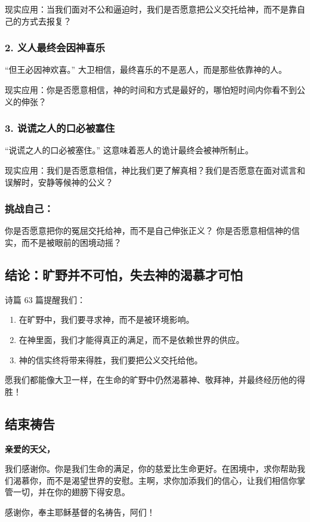 \documentclass[a4paper, 12pt]{article}
\begin{document}
现实应用：当我们面对不公和逼迫时，我们是否愿意把公义交托给神，而不是靠自己的方式去报复？
\subsubsection*{2. 义人最终会因神喜乐}
“但王必因神欢喜。” 大卫相信，最终喜乐的不是恶人，而是那些依靠神的人。

现实应用：你是否愿意相信，神的时间和方式是最好的，哪怕短时间内你看不到公义的伸张？
\subsubsection*{3. 说谎之人的口必被塞住}
“说谎之人的口必被塞住。” 这意味着恶人的诡计最终会被神所制止。

现实应用：我们是否愿意相信，神比我们更了解真相？我们是否愿意在面对谎言和误解时，安静等候神的公义？
\subsubsection*{挑战自己：}
你是否愿意把你的冤屈交托给神，而不是自己伸张正义？
你是否愿意相信神的信实，而不是被眼前的困境动摇？
\subsection*{结论：旷野并不可怕，失去神的渴慕才可怕}
诗篇 63 篇提醒我们：
\begin{enumerate}
    \item 在旷野中，我们要寻求神，而不是被环境影响。

    \item 在神里面，我们才能得真正的满足，而不是依赖世界的供应。

    \item 神的信实终将带来得胜，我们要把公义交托给他。

\end{enumerate}

愿我们都能像大卫一样，在生命的旷野中仍然渴慕神、敬拜神，并最终经历他的得胜！

\subsection*{结束祷告}
\textbf{亲爱的天父，}

我们感谢你。你是我们生命的满足，你的慈爱比生命更好。在困境中，求你帮助我们渴慕你，而不是渴望世界的安慰。主啊，求你加添我们的信心，让我们相信你掌管一切，并在你的翅膀下得安息。

感谢你，奉主耶稣基督的名祷告，阿们！
\newpage
\end{document}
